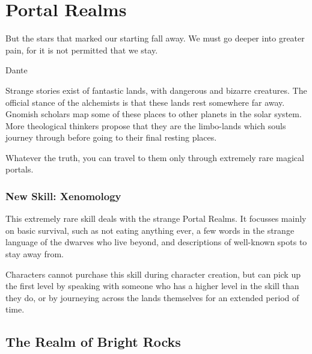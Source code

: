 \chapter{Portal Realms}
\label{ether}
\label{portalRealms}

\epigraph{But the stars that marked our starting fall away.
We must go deeper into greater pain,
for it is not permitted that we stay.}{Dante}

\begin{multicols}{2}

\noindent
Strange stories exist of fantastic lands, with dangerous and bizarre creatures.  The official stance of the \gls{alchemists} is that these lands rest somewhere far away.
Gnomish scholars map some of these places to other planets in the solar system.
More theological thinkers propose that they are the limbo-lands which souls journey through before going to their final resting places.

Whatever the truth, you can travel to them only through extremely rare magical portals.

\subsection{New Skill: Xenomology}
\label{Xenomology}

This extremely rare skill deals with the strange Portal Realms.
It focusses mainly on basic survival, such as not eating anything ever, a few words in the strange language of the dwarves who live beyond, and descriptions of well-known spots to stay away from.

Characters cannot purchase this skill during character creation, but can pick up the first level by speaking with someone who has a higher level in the skill than they do, or by journeying across the lands themselves for an extended period of time.

\end{multicols}

\section{The Realm of Bright Rocks}
\label{brightrocks}

